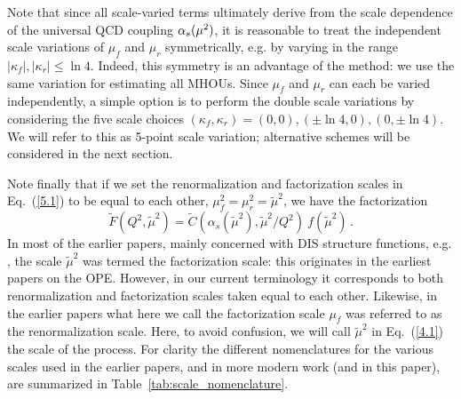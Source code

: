 Note that since all scale-varied terms ultimately derive from the
scale dependence of the universal QCD coupling $\alpha_s(\mu^2)$, it is
reasonable to treat the
independent scale variations of $\mu_f$ and $\mu_r$ symmetrically,
e.g. by varying in the range $|\kappa_f|, |\kappa_r| 
\leq \ln 4$.
%
Indeed, this symmetry is an advantage  of the
method: we use the same variation for estimating all MHOUs.
%
Since
$\mu_f$ and $\mu_r$ can each be varied independently, a simple option
is to perform the double scale variations by considering the five  scale choices
$(\kappa_f,\kappa_r)= (0,0),(\pm 
\ln 4,0),(0,\pm \ln 4)$.
%
We will refer to this as 5-point scale
variation; alternative schemes will be considered in the
next section.

Note finally that if we set the renormalization and factorization
 scales in Eq.~(\ref{5.1}) to be equal to each other, $\mu_f^2=\mu_r^2
= \tilde{\mu}^2$, we have the factorization 
%
\begin{equation} 
    \widetilde{F}(Q^2, \tilde\mu^2) = \widetilde{C}(\alpha_s(\tilde\mu^2), \tilde\mu^2/Q^2)\ f(\tilde\mu^2) \, .
\label{4.1}
\end{equation}
%
In most of the earlier papers, mainly concerned
with DIS structure functions,
e.g. \cite{Altarelli:1988qr,Nason:1987xz,Close:1987ay,Martin:1990fq,Virchaux:1991jc},
the scale
$\tilde\mu^2$ was termed the factorization scale:
this  originates in the earliest papers on the OPE. However, in our current
terminology it corresponds to both renormalization and factorization
scales taken equal to each other.
%
Likewise, in the earlier papers what here we call the factorization scale 
$\mu_f$ was referred to as the renormalization scale.
Here, to avoid
 confusion, we will call $\tilde\mu^2$ in Eq.~(\ref{4.1})  the scale
 of the process.
 For clarity the different nomenclatures for the various scales used in 
the earlier papers, and in more modern work (and in this paper), are 
 summarized in Table~\ref{tab:scale_nomenclature}. 

